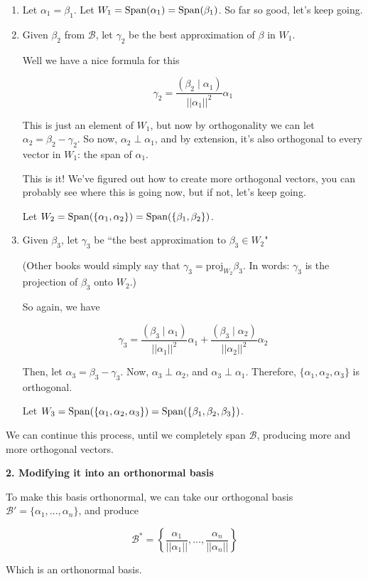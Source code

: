 \documentclass[12pt]{article}
\def\proj{\text{proj}}
\def\B{\mathcal B}
\newcommand{\ip}[2]{\left( #1 \mid #2 \right)}
\begin{document}
  \begin{enumerate}
    \item Let $\alpha_1 = \beta_1$. Let $W_1 = \mathrm{Span}(\alpha_1) =
      \mathrm{Span}(\beta_1)$. So far so good, let's keep going.

    \item Given $\beta_2$ from $\B$, let $\gamma_2$ be the best approximation of
      $\beta$ in $W_1$. 

      Well we have a nice formula for this

      \[
        \gamma_2 = \frac{\ip{\beta_2}{\alpha_1}}{||\alpha_1||^2} \alpha_1
      \]

      This is just an element of $W_1$, but now by orthogonality we can let
      $\alpha_2 = \beta_2 - \gamma_2$. So now, $\alpha_2 \perp \alpha_1$, and by
      extension, it's also orthogonal to every vector in $W_1$: the span of
      $\alpha_1$.

      This is it! We've figured out how to create more orthogonal vectors, you
      can probably see where this is going now, but if not, let's keep going.

      Let $W_2 = \mathrm{Span}(\{\alpha_1, \alpha_2\}) = \mathrm{Span}(\{\beta_1, \beta_2\})$.

    \item Given $\beta_3$, let $\gamma_3$ be ``the best approximation to
      $\beta_3 \in W_2$"

      (Other books would simply say that $\gamma_3 = \proj_{W_2} \beta_3$. In
      words: $\gamma_3$ is the projection of $\beta_3$ onto $W_2$.)
      
      So again, we have

      \[
        \gamma_3 = \frac{\ip{\beta_3}{\alpha_1}}{||\alpha_1||^2} \alpha_1 +
        \frac{\ip{\beta_3}{\alpha_2}}{||\alpha_2||^2} \alpha_2
      \]

      Then, let $\alpha_3 = \beta_3 - \gamma_3$. Now, $\alpha_3 \perp \alpha_2$,
      and $\alpha_3 \perp \alpha_1$. Therefore, $\{\alpha_1, \alpha_2,
      \alpha_3\}$ is orthogonal.

      Let $W_3 = \mathrm{Span}(\{\alpha_1, \alpha_2, \alpha_3\}) = \mathrm{Span}(\{\beta_1,
      \beta_2, \beta_3\})$.
  \end{enumerate}

  We can continue this process, until we completely span $\B$, producing more
  and more orthogonal vectors.

  {\bf 2. Modifying it into an orthonormal basis}

  To make this basis orthonormal, we can take our orthogonal basis $\B' =
  \{\alpha_1, \dots, \alpha_n\}$, and produce

  \[
    \B^* = \left\{\frac{\alpha_1}{||\alpha_1||}, \dots, \frac{\alpha_n}{||\alpha_n||}\right\}
  \]

  Which is an orthonormal basis.
\end{document}
